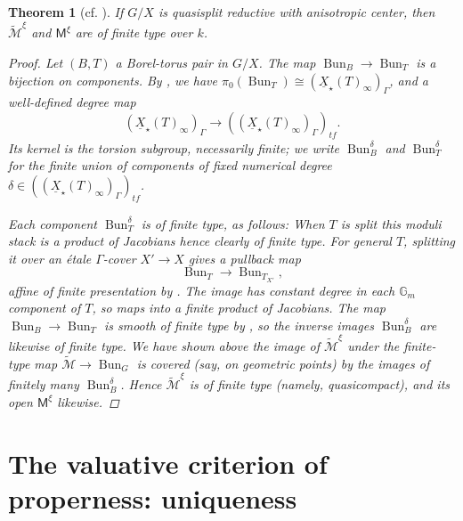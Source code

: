 \documentclass[openany]{amsbook}
\newtheorem{theorem}{Theorem}[chapter]
\theoremstyle{definition}
\theoremstyle{remark}
\numberwithin{equation}{section}
\newcommand{\G}{\mathbb{G}}
\newcommand{\cM}{\mathcal{M}}
\newcommand{\ul}[1]{\underline{#1}}
\renewcommand{\-}{\operatorname{-}}
\newcommand{\on}[1]{\operatorname{#1}}
\newcommand{\ctM}{\widetilde{\cM}}
\newcommand{\bM}{\mathsf{M}}
\newcommand{\tf}{\mathit{tf}}
\newcommand{\Bun}{\on{Bun}}
\begin{document}
\begin{theorem}[{{cf. \cite[{Proposition 6.1.5}]{CLI}}}]\label{thm.bdd}
    If $G/X$ is quasisplit reductive with anisotropic center, then $\ctM^\xi$ and $\bM^\xi$ are of finite type over $k$.
    \begin{proof}
        Let $(B,T)$ a Borel-torus pair in $G/X$. The map $\on{Bun}_B \to \on{Bun}_T$ is a bijection on components. By \cite[Lemma 16(1)]{HeinlothRelUnif}, we have $\pi_0(\Bun_T) \cong (\ul{X}_\star(T)_\infty)_\Gamma$, and a well-defined degree map 
        $$
            (\ul{X}_\star(T)_\infty)_\Gamma \to ((\ul{X}_\star(T)_\infty)_\Gamma)_{\tf}.
        $$
        Its kernel is the torsion subgroup, necessarily finite; we write $\on{Bun}_B^\delta$ and $\on{Bun}_T^\delta$ for the finite union of components of fixed numerical degree $\delta \in ((\ul{X}_\star(T)_\infty)_\Gamma)_{\tf}$. 
        
        Each component $\on{Bun}_T^\delta$ is of finite type, as follows: When $T$ is split this moduli stack is a product of Jacobians hence clearly of finite type. For general $T$, splitting it over an \'etale $\Gamma$-cover $X' \to X$ gives a pullback map
        $$
        \on{Bun}_T \to \on{Bun}_{T_{X'}},
        $$
        affine of finite presentation by \cite[Proposition 4.4.3]{behrendthesis}. The image has constant degree in each $\G_m$ component of $T$, so maps into a finite product of Jacobians. The map $\Bun_B \to \Bun_T$ is smooth of finite type by \cite[Proposition 8.1.7]{behrendthesis}, so the inverse images $\on{Bun}_B^\delta$ are likewise of finite type. We have shown above the image of $\ctM^{\xi}$ under the finite-type map $\ctM \to \on{Bun}_G$ is covered (say, on geometric points) by the images of finitely many $\on{Bun}_B^{\delta}$. Hence $\ctM^{\xi}$ is of finite type (namely, quasicompact), and its open $\bM^\xi$ likewise.
    \end{proof}
\end{theorem}

















\chapter{The valuative criterion of properness: uniqueness}\label{sect.val.unique}
\end{document}
